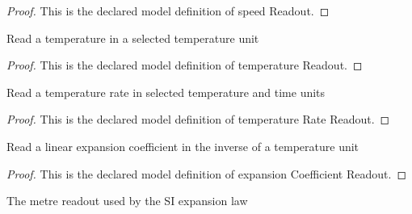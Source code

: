 \begin{proof}
  This is the declared model definition of speed Readout.
\end{proof}
\begin{definition}
  \label{def:physics:phyx-mini-0156:phyxminiproblems-problemphyxmini0156-temperaturereadout}
  Read a temperature in a selected temperature unit
\end{definition}
\begin{proof}
  This is the declared model definition of temperature Readout.
\end{proof}
\begin{definition}
  \label{def:physics:phyx-mini-0156:phyxminiproblems-problemphyxmini0156-temperatureratereadout}
  Read a temperature rate in selected temperature and time units
\end{definition}
\begin{proof}
  This is the declared model definition of temperature Rate Readout.
\end{proof}
\begin{definition}
  \label{def:physics:phyx-mini-0156:phyxminiproblems-problemphyxmini0156-expansioncoefficientreadout}
  Read a linear expansion coefficient in the inverse of a temperature unit
\end{definition}
\begin{proof}
  This is the declared model definition of expansion Coefficient Readout.
\end{proof}
\begin{definition}
  \label{def:physics:phyx-mini-0156:phyxminiproblems-problemphyxmini0156-lengthinmeters}
  The metre readout used by the SI expansion law
\end{definition}

